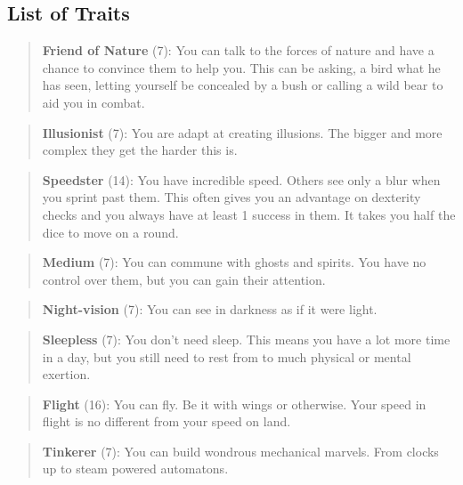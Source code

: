 \documentclass[11pt]{article}
\begin{document}
{\subsection{List of Traits}
\label{sec:orga2eb42f}
\begin{quote}
\textbf{Friend of Nature} (7): You can talk to the forces of nature and have a chance to convince them to help you. This can be asking, a bird what he has seen, letting yourself be concealed by a bush or calling a wild bear to aid you in combat.
\end{quote}

\begin{quote}
\textbf{Illusionist} (7): You are adapt at creating illusions. The bigger and more complex they get the harder this is.
\end{quote}

\begin{quote}
\textbf{Speedster} (14): You have incredible speed. Others see only a blur when you sprint past them. This often gives you an advantage on dexterity checks and you always have at least 1 success in them. It takes you half the dice to move on a round.
\end{quote}

\begin{quote}
\textbf{Medium} (7): You can commune with ghosts and spirits. You have no control over them, but you can gain their attention.
\end{quote}

\begin{quote}
\textbf{Night-vision} (7): You can see in darkness as if it were light.
\end{quote}

\begin{quote}
\textbf{Sleepless} (7): You don't need sleep. This means you have a lot more time in a day, but you still need to rest from to much physical or mental exertion.
\end{quote}

\begin{quote}
\textbf{Flight} (16): You can fly. Be it with wings or otherwise. Your speed in flight is no different from your speed on land.
\end{quote}

\begin{quote}
\textbf{Tinkerer} (7): You can build wondrous mechanical marvels. From clocks up to steam powered automatons. 
\end{quote}

}
\end{document}
